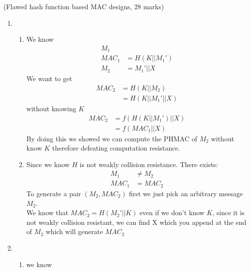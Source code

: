 \documentclass{assignment}
\begin{document}
\begin{problemlist}

\pbitem (Flawed hash function based MAC designs, 28 marks)
\begin{problem}
\begin{answer}

\begin{enumerate}[label=(\alph*)]
	\item \begin{enumerate}
    		\item We know
            	  \begin{align*}
    				M_1 \\
                    MAC_1 &= H(K||M_1') \\
                    M_2 &= M_1' || X 
  			 	  \end{align*}
                  We want to get
                  \begin{align*}
                  	MAC_2 &= H(K||M_2) \\
                    	  &= H(K||M_1'||X) 
                  \end{align*}
                  without knowing $K$
           		  \begin{align*}
                  	MAC_2 &= f( H(K||M_1')||X) \\
                    	  &= f(MAC_1 ||X)
                  \end{align*}
                  By doing this we showed we can compute the PHMAC of $M_2$ without know $K$ therefore defeating computation resistance. \\
            \item Since we know $H$ is not weakly collision resistance. There exists:
            	  \begin{align*}
            		M_1 &\neq M_2 \\
                    MAC_1 &= MAC_2
            	  \end{align*}
                  To generate a pair $(M_2, MAC_2)$ first we just pick an arbitrary message $M_2$. \\
                  We know that $MAC_2 = H(M_2'||K)$ even if we don't know $K$, since it is not weakly collision 				  resistant, we can find X which you append at the end of $M_2$ which will generate $MAC_2$ \\
		  \end{enumerate} 
  	\item \begin{enumerate}
    		\item we know

\end{enumerate}
\end{enumerate}
\end{answer}
\end{problem}
\end{problemlist}
\end{document}
